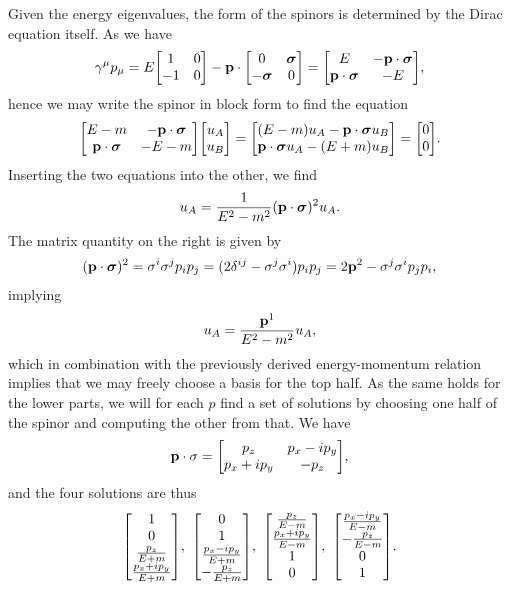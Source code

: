 Given the energy eigenvalues, the form of the spinors is determined by the Dirac equation itself. As we have
\begin{align*}
	\gamma^{\mu}p_{\mu} = E\mqty[
		1  & 0 \\
		-1 & 0
	] - \vb{p}\cdot\mqty[
		0             & \vb*{\sigma} \\
		-\vb*{\sigma} & 0
	] = \mqty[
	E                       & -\vb{p}\cdot\vb*{\sigma} \\
	\vb{p}\cdot\vb*{\sigma} & -E
	],
\end{align*}
hence we may write the spinor in block form to find the equation
\begin{align*}
	\mqty[
		E - m                   & -\vb{p}\cdot\vb*{\sigma} \\
		\vb{p}\cdot\vb*{\sigma} & -E - m
	]\mqty[
		u_{A} \\
		u_{B}
	] = 
	\mqty[
		(E - m)u_{A} - \vb{p}\cdot\vb*{\sigma}u_{B} \\
		\vb{p}\cdot\vb*{\sigma}u_{A} - (E + m)u_{B}
	] = \mqty[
		0 \\
		0
	].
\end{align*}
Inserting the two equations into the other, we find
\begin{align*}
	u_{A} = \frac{1}{E^{2} - m^{2}}(\vb{p}\cdot\vb*{\sigma})^{2}u_{A}.
\end{align*}
The matrix quantity on the right is given by
\begin{align*}
	(\vb{p}\cdot\vb*{\sigma})^{2} = \sigma^{i}\sigma^{j}p_{i}p_{j} = (2\delta^{ij} - \sigma^{j}\sigma^{i})p_{i}p_{j} = 2\vb{p}^{2} - \sigma^{j}\sigma^{i}p_{j}p_{i},
\end{align*}
implying
\begin{align*}
	u_{A} = \frac{\vb{p}^{1}}{E^{2} - m^{2}}u_{A},
\end{align*}
which in combination with the previously derived energy-momentum relation implies that we may freely choose a basis for the top half. As the same holds for the lower parts, we will for each $p$ find a set of solutions by choosing one half of the spinor and computing the other from that. We have
\begin{align*}
	\vb{p}\cdot\vb{\sigma} = \mqty[
		p_{z}          & p_{x} - ip_{y} \\
		p_{x} + ip_{y} & -p_{z}
	],
\end{align*}
and the four solutions are thus
\begin{align*}
	\mqty[
		1 \\
		0 \\
		\frac{p_{z}}{E + m} \\
		\frac{p_{x} + ip_{y}}{E + m}
	],\ \mqty[
		0 \\
		1 \\
		\frac{p_{x} - ip_{y}}{E + m} \\
		-\frac{p_{z}}{E + m}
	],\ \mqty[
		\frac{p_{z}}{E - m} \\
		\frac{p_{x} + ip_{y}}{E - m} \\
		1 \\
		0
	],\ \mqty[
		\frac{p_{x} - ip_{y}}{E - m} \\
		-\frac{p_{z}}{E - m} \\
		0 \\
		1
	].
\end{align*}
